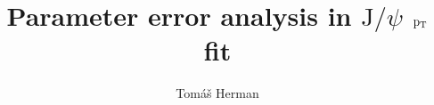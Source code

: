 \documentclass{beamer}
\title[]{Parameter error analysis in $\mathrm{J}/\psi$ $\mathrm{p}_\mathrm{\tiny{T}}$ fit} %
\author{Tomáš Herman} %
\institute[FNSPE-CTU] %
{Faculty of Nuclear Sciences and Physical Engineering \\ Czech Technical University in Prague  }%
\date{}
\begin{document}
\begin{frame}
\titlepage %
\end{frame}


\end{document}
